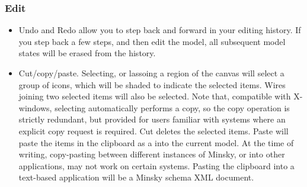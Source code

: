 \subsubsection{Edit}

\label{Edit}
\begin{itemize}
\item \label{edit:undo} Undo and Redo allow you to step back and forward
in your editing history. If you step back a few steps, and then edit
the model, all subsequent model states will be erased from the history.
\item \label{edit:copy} Cut/copy/paste. Selecting, or lassoing a region
of the canvas will select a group of icons, which will be shaded to
indicate the selected items. Wires joining two selected items will
also be selected. Note that, compatible with X-windows, selecting
automatically performs a copy, so the copy operation is strictly redundant,
but provided for users familiar with systems where an explicit copy
request is required. Cut deletes the selected items. Paste will paste
the items in the clipboard as a  into the
current model. At the time of writing, copy-pasting between different
instances of Minsky, or into other applications, may not work on certain
systems. Pasting the clipboard into a text-based application will
be a Minsky schema XML document.


\end{itemize}
